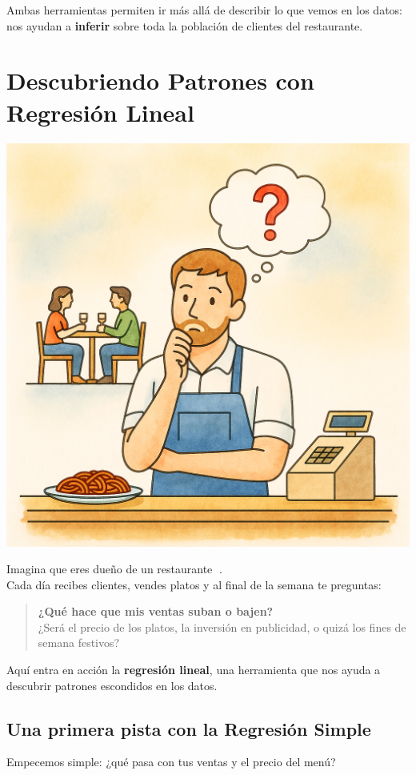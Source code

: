 \documentclass[
  spanish,
  letterpaper,
  DIV=11,
  numbers=noendperiod]{scrreprt}
\begin{document}
Ambas herramientas permiten ir más allá de describir lo que vemos en los
datos: nos ayudan a \textbf{inferir} sobre toda la población de clientes
del restaurante.


\chapter{Descubriendo Patrones con Regresión
Lineal}\label{descubriendo-patrones-con-regresiuxf3n-lineal}

\begin{center}
\includegraphics[width=0.6\linewidth,height=\textheight,keepaspectratio]{img/reg_1.png}
\end{center}

Imagina que eres dueño de un restaurante 🍝.\\
Cada día recibes clientes, vendes platos y al final de la semana te
preguntas:

\begin{quote}
\textbf{¿Qué hace que mis ventas suban o bajen?}\\
¿Será el precio de los platos, la inversión en publicidad, o quizá los
fines de semana festivos?
\end{quote}

Aquí entra en acción la \textbf{regresión lineal}, una herramienta que
nos ayuda a descubrir patrones escondidos en los datos.

\section{Una primera pista con la Regresión
Simple}\label{una-primera-pista-con-la-regresiuxf3n-simple}

Empecemos simple: ¿qué pasa con tus ventas y el precio del menú?
\end{document}
